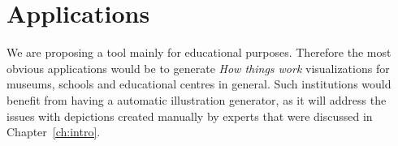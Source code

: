 \chapter{Applications}

We are proposing a tool mainly for educational purposes.
Therefore the most obvious applications would be to generate \textit{How things work} visualizations for museums, schools and educational centres in general.
Such institutions would benefit from having a automatic illustration generator, as it will address the issues with depictions created manually by experts that were discussed in Chapter~\ref{ch:intro}.

